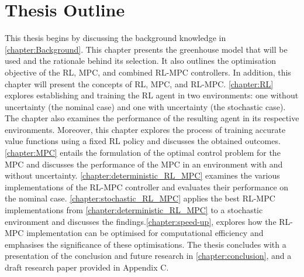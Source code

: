 \section{Thesis Outline}
This thesis begins by discussing the background knowledge in \cref{chapter:Background}.  This chapter presents the greenhouse model that will be used and the rationale behind its selection. It also outlines the optimisation objective of the RL, MPC, and combined RL-MPC controllers. In addition, this chapter will present the concepts of RL, MPC, and RL-MPC. \cref{chapter:RL} explores establishing and training the RL agent in two environments: one without uncertainty (the nominal case) and one with uncertainty (the stochastic case). The chapter also examines the performance of the resulting agent in its respective environments. Moreover, this chapter explores the process of training accurate value functions using a fixed RL policy and discusses the obtained outcomes. \cref{chapter:MPC} entails the formulation of the optimal control problem for the MPC and discusses the performance of the MPC in an environment with and without uncertainty. \cref{chapter:deterministic_RL_MPC} examines the various implementations of the RL-MPC controller and evaluates their performance on the nominal case. \cref{chapter:stochastic_RL_MPC} applies the best RL-MPC implementations from \cref{chapter:deterministic_RL_MPC} to a stochastic environment and discusses the findings.\cref{chapter:speed-up}, explores how the RL-MPC implementation can be optimised for computational efficiency and emphasises the significance of these optimisations. The thesis concludes with a presentation of the conclusion and future research in \cref{chapter:conclusion}, and a draft research paper provided in Appendix C.

